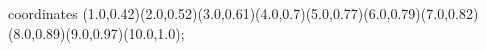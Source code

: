 					coordinates { (1.0,0.42)(2.0,0.52)(3.0,0.61)(4.0,0.7)(5.0,0.77)(6.0,0.79)(7.0,0.82)(8.0,0.89)(9.0,0.97)(10.0,1.0)};